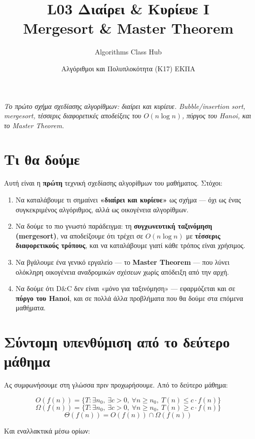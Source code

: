 \documentclass[11pt,a4paper]{article}
\title{\textbf{L03 \textperiodcentered{} Διαίρει \& Κυρίευε I}\\[2pt]
\large Mergesort \& Master Theorem}
\author{Algorithms Class Hub}
\date{\small Αλγόριθμοι και Πολυπλοκότητα (K17) \textperiodcentered{} ΕΚΠΑ}
\begin{document}
\maketitle

\begin{center}\itshape\small
Το πρώτο σχήμα σχεδίασης αλγορίθμων: διαίρει και κυρίευε. Bubble/insertion sort,
mergesort, τέσσερις διαφορετικές αποδείξεις του $O(n \log n)$, πύργος του Hanoi,
και το Master Theorem.
\end{center}

\section{Τι θα δούμε}

Αυτή είναι η \textbf{πρώτη} τεχνική σχεδίασης αλγορίθμων του μαθήματος. Στόχοι:

\begin{enumerate}
  \item Να καταλάβουμε τι σημαίνει \textbf{«διαίρει και κυρίευε»} ως σχήμα --- όχι
  ως ένας συγκεκριμένος αλγόριθμος, αλλά ως οικογένεια αλγορίθμων.
  \item Να δούμε το πιο γνωστό παράδειγμα: τη \textbf{συγχωνευτική ταξινόμηση
  (mergesort)}, να αποδείξουμε ότι τρέχει σε $O(n \log n)$ με \textbf{τέσσερις
  διαφορετικούς τρόπους}, και να καταλάβουμε γιατί κάθε τρόπος είναι χρήσιμος.
  \item Να βγάλουμε ένα γενικό εργαλείο --- το \textbf{Master Theorem} --- που
  λύνει ολόκληρη οικογένεια αναδρομικών σχέσεων χωρίς απόδειξη από την αρχή.
  \item Να δούμε ότι D\&C δεν είναι «μόνο για ταξινόμηση» --- εφαρμόζεται και σε
  \textbf{πύργο του Hanoi}, και σε πολλά άλλα προβλήματα που θα δούμε στα επόμενα
  μαθήματα.
\end{enumerate}

\section{Σύντομη υπενθύμιση από το δεύτερο μάθημα}

Ας συμφωνήσουμε στη γλώσσα πριν προχωρήσουμε. Από το δεύτερο μάθημα:

\[
O(f(n)) = \{T : \exists n_0,\ \exists c > 0,\ \forall n \ge n_0,\ T(n) \le c
\cdot f(n)\}
\]
\[
\Omega(f(n)) = \{T : \exists n_0,\ \exists c > 0,\ \forall n \ge n_0,\ T(n) \ge c
\cdot f(n)\}
\]
\[
\Theta(f(n)) = O(f(n)) \cap \Omega(f(n))
\]

Και εναλλακτικά μέσω ορίων:
\end{document}
